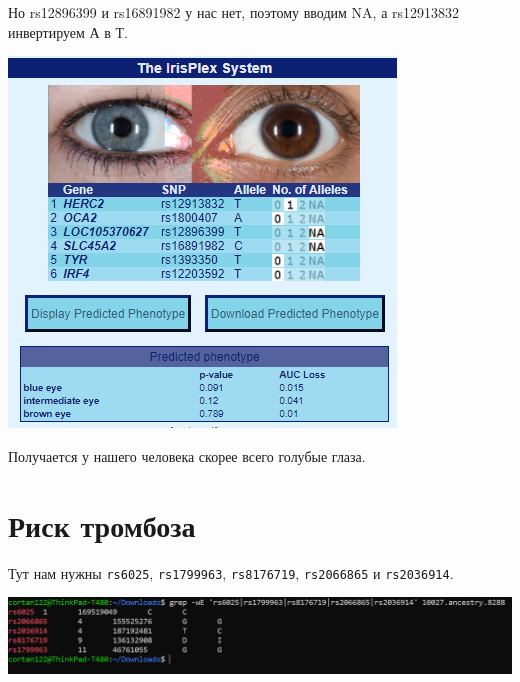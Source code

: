 \documentclass{article}
\begin{document}
  Но rs12896399 и rs16891982 у нас нет, поэтому вводим NA, а rs12913832 инвертируем А в Т.

  \noindent
  \includegraphics[width=\textwidth]{iris.png}

  Получается у нашего человека скорее всего голубые глаза.

  \section{Риск тромбоза}
  Тут нам нужны \texttt{rs6025}, \texttt{rs1799963}, \texttt{rs8176719}, \texttt{rs2066865} и \texttt{rs2036914}.

  \noindent
  \includegraphics[width=\textwidth]{image20210313151316.png}
\end{document}
